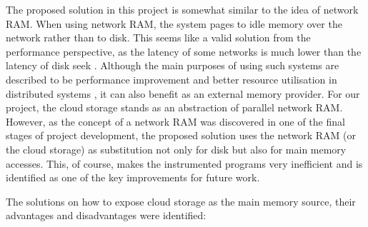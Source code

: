 \documentclass[bsc,frontabs,twoside,singlespacing,parskip,deptreport]{infthesis}     %
\begin{document}
The proposed solution in this project is somewhat similar to the idea of network RAM. When using network RAM, the system pages to idle memory over the network rather than to disk. This seems like a valid solution from the performance perspective, as the latency of some networks is much lower than the latency of disk seek \citep{numbers_should_know}. Although the main purposes of using such systems are described to be performance improvement \citep{Anderson:1998:ENR:893677} and better resource utilisation in distributed systems \citep{1327942}, it can also benefit as an external memory provider. For our project, the cloud storage stands as an abstraction of parallel network RAM. However, as the concept of a network RAM was discovered in one of the final stages of project development, the proposed solution uses the network RAM (or the cloud storage) as substitution not only for disk but also for main memory accesses. This, of course, makes the instrumented programs very inefficient and is identified as one of the key improvements for future work.


The solutions on how to expose cloud storage as the main memory source, their advantages and disadvantages were identified:
\end{document}
